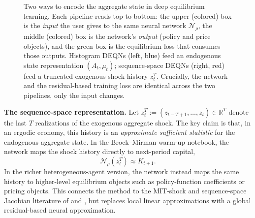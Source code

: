 \documentclass[11pt,a4paper]{report}
\newcommand{\R}{\mathbb{R}}
\begin{document}
\begin{figure}[ht]
\caption{Two ways to encode the aggregate state in deep equilibrium learning.  Each pipeline reads top-to-bottom: the upper (colored) box is the \emph{input} the user gives to the same neural network $\mathcal{N}_\rho$, the middle (colored) box is the network's \emph{output} (policy and price objects), and the green box is the equilibrium loss that consumes those outputs.  Histogram DEQNs (left, blue) feed an endogenous state representation $(A_t, \mu_t)$; sequence-space DEQNs (right, red) feed a truncated exogenous shock history $z_t^T$.  Crucially, the network and the residual-based training loss are identical across the two pipelines, only the input changes.}
\label{fig:sequence_space_compare}
\end{figure}

\medskip\noindent\textbf{The sequence-space representation.}
Let $z_t^T := (z_{t-T+1}, \ldots, z_t) \in \R^T$ denote the last $T$ realizations of the exogenous aggregate shock.  The key claim is that, in an ergodic economy, this history is an \emph{approximate sufficient statistic} for the endogenous aggregate state.  In the Brock--Mirman warm-up notebook, the network maps the shock history directly to next-period capital,
\[
\mathcal{N}_\rho(z_t^T) \approx K_{t+1}.
\]
In the richer heterogeneous-agent version, the network instead maps the same history to higher-level equilibrium objects such as policy-function coefficients or pricing objects.  This connects the method to the MIT-shock and sequence-space Jacobian literature of \citet{boppart2018exploiting} and \citet{auclert2021using}, but replaces local linear approximations with a global residual-based neural approximation.
\end{document}
